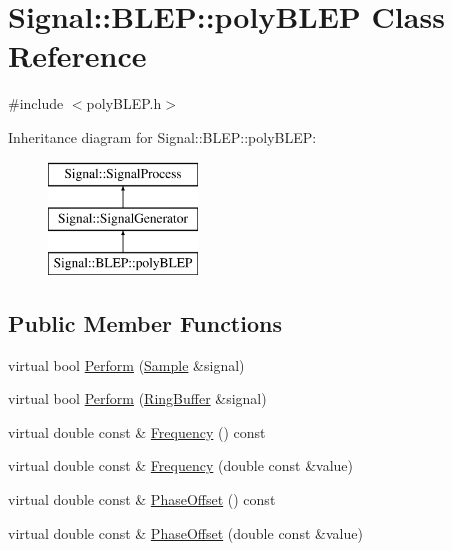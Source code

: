 \hypertarget{classSignal_1_1BLEP_1_1polyBLEP}{\section{Signal\+:\+:B\+L\+E\+P\+:\+:poly\+B\+L\+E\+P Class Reference}
\label{classSignal_1_1BLEP_1_1polyBLEP}
}


{\ttfamily \#include $<$poly\+B\+L\+E\+P.\+h$>$}

Inheritance diagram for Signal\+:\+:B\+L\+E\+P\+:\+:poly\+B\+L\+E\+P\+:\begin{figure}[H]
\begin{center}
\leavevmode
\includegraphics[height=3.000000cm]{classSignal_1_1BLEP_1_1polyBLEP}
\end{center}
\end{figure}
\subsection*{Public Member Functions}
\begin{DoxyCompactItemize}
\item 
virtual bool \hyperlink{classSignal_1_1SignalGenerator_a2cd9061c5ae40a392a9476551b4379f3}{Perform} (\hyperlink{classSignal_1_1Sample}{Sample} \&signal)
\item 
virtual bool \hyperlink{classSignal_1_1SignalGenerator_a126d52dd9b6b14d33efc624e2c89284e}{Perform} (\hyperlink{classSignal_1_1RingBuffer}{Ring\+Buffer} \&signal)
\item 
virtual double const \& \hyperlink{classSignal_1_1SignalGenerator_a96af42ee68f94e9b04d034fd68b73ecd}{Frequency} () const 
\item 
virtual double const \& \hyperlink{classSignal_1_1SignalGenerator_af83b532bf3ddc3637c2fd7a1dfd095cb}{Frequency} (double const \&value)
\item 
virtual double const \& \hyperlink{classSignal_1_1SignalGenerator_ac2538ec946f001e394d2416fda698d1c}{Phase\+Offset} () const 
\item 
virtual double const \& \hyperlink{classSignal_1_1SignalGenerator_ac6a103ff72beaa338f6d18c812522d78}{Phase\+Offset} (double const \&value)
\end{DoxyCompactItemize}

